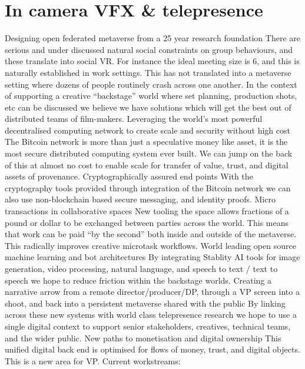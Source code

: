 \section{In camera VFX \& telepresence}
Designing open federated metaverse from a 25 year research foundation
There are serious and under discussed natural social constraints on group behaviours, and these translate into social VR. For instance the ideal meeting size is 6, and this is naturally established in work settings. This has not translated into a metaverse setting where dozens of people routinely crash across one another. In the context of supporting a creative “backstage” world where set planning, production shots, etc can be discussed we believe we have solutions which will get the best out of distributed teams of film-makers.
Leveraging the world's most powerful decentralised computing network to create 
scale and security without high cost
The Bitcoin network is more than just a speculative money like asset, it is the most secure distributed computing system ever built. We can jump on the back of this at almost no cost to enable scale for transfer of value, trust, and digital assets of provenance.
Cryptographically assured end points
With the cryptography tools provided through integration of the Bitcoin network we can also use non-blockchain based secure messaging, and identity proofs. 
Micro transactions in collaborative spaces
New tooling the space allows fractions of a pound or dollar to be exchanged between parties across the world. This means that work can be paid “by the second” both inside and outside of the metaverse. This radically improves creative microtask workflows.
World leading open source machine learning and bot architectures
By integrating Stablity AI tools for image generation, video processing, natural language, and speech to text / text to speech we hope to reduce friction within the backstage worlds.
Creating a narrative arrow from a remote director/producer/DP, through a VP screen into a shoot, and back into a persistent metaverse shared with the public
By linking across these new systems with world class telepresence research we hope to use a single digital context to support senior stakeholders, creatives, technical teams, and the wider public.
New paths to monetisation and digital ownership
This unified digital back end is optimised for flows of money, trust, and digital objects. This is a new area for VP.
Current workstreams:

